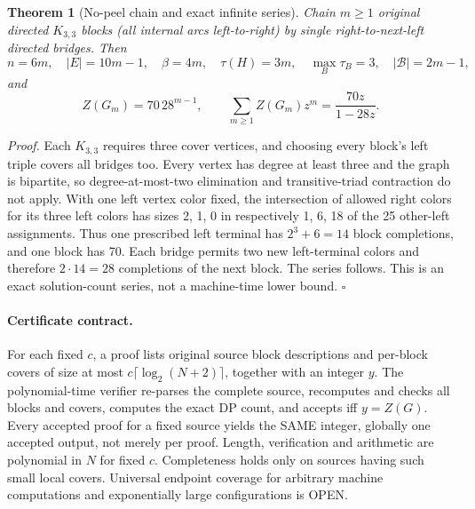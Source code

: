 \documentclass[11pt]{article}
\newtheorem{theorem}{Theorem}
\begin{document}
\begin{theorem}[No-peel chain and exact infinite series]
Chain $m\ge1$ original directed $K_{3,3}$ blocks (all internal arcs left-to-right) by single right-to-next-left directed bridges. Then
\[
n=6m,\quad |E|=10m-1,\quad \beta=4m,\quad\tau(H)=3m,\quad
\max_B\tau_B=3,\quad|\mathcal B|=2m-1,
\]
and
\[
Z(G_m)=70\,28^{m-1},\qquad\sum_{m\ge1}Z(G_m)z^m=\frac{70z}{1-28z}.
\]
\end{theorem}
\noindent\emph{Proof.} Each $K_{3,3}$ requires three cover vertices, and choosing every block's left triple covers all bridges too. Every vertex has degree at least three and the graph is bipartite, so degree-at-most-two elimination and transitive-triad contraction do not apply. With one left vertex color fixed, the intersection of allowed right colors for its three left colors has sizes 2, 1, 0 in respectively 1, 6, 18 of the 25 other-left assignments. Thus one prescribed left terminal has $2^3+6=14$ block completions, and one block has 70. Each bridge permits two new left-terminal colors and therefore $2\cdot14=28$ completions of the next block. The series follows. This is an exact solution-count series, not a machine-time lower bound. $\square$

\paragraph{Certificate contract.}
For each fixed $c$, a proof lists original source block descriptions and per-block covers of size at most $c\lceil\log_2(N+2)\rceil$, together with an integer $y$. The polynomial-time verifier re-parses the complete source, recomputes and checks all blocks and covers, computes the exact DP count, and accepts iff $y=Z(G)$. Every accepted proof for a fixed source yields the SAME integer, globally one accepted output, not merely per proof. Length, verification and arithmetic are polynomial in $N$ for fixed $c$. Completeness holds only on sources having such small local covers. Universal endpoint coverage for arbitrary machine computations and exponentially large configurations is OPEN.
\end{document}
